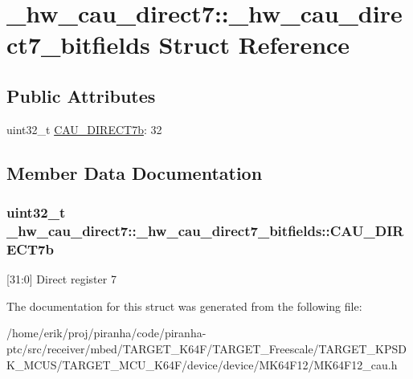 \hypertarget{struct__hw__cau__direct7_1_1__hw__cau__direct7__bitfields}{}\section{\+\_\+hw\+\_\+cau\+\_\+direct7\+:\+:\+\_\+hw\+\_\+cau\+\_\+direct7\+\_\+bitfields Struct Reference}
\label{struct__hw__cau__direct7_1_1__hw__cau__direct7__bitfields}
\subsection*{Public Attributes}
\begin{DoxyCompactItemize}
\item 
uint32\+\_\+t \hyperlink{struct__hw__cau__direct7_1_1__hw__cau__direct7__bitfields_ae5ff2f074fe2e7457a8491fe7e84d2f1}{C\+A\+U\+\_\+\+D\+I\+R\+E\+C\+T7b}\+: 32
\end{DoxyCompactItemize}


\subsection{Member Data Documentation}
\subsubsection[{\texorpdfstring{C\+A\+U\+\_\+\+D\+I\+R\+E\+C\+T7b}{CAU_DIRECT7b}}]{\setlength{\rightskip}{0pt plus 5cm}uint32\+\_\+t \+\_\+hw\+\_\+cau\+\_\+direct7\+::\+\_\+hw\+\_\+cau\+\_\+direct7\+\_\+bitfields\+::\+C\+A\+U\+\_\+\+D\+I\+R\+E\+C\+T7b}\hypertarget{struct__hw__cau__direct7_1_1__hw__cau__direct7__bitfields_ae5ff2f074fe2e7457a8491fe7e84d2f1}{}\label{struct__hw__cau__direct7_1_1__hw__cau__direct7__bitfields_ae5ff2f074fe2e7457a8491fe7e84d2f1}
\mbox{[}31\+:0\mbox{]} Direct register 7 

The documentation for this struct was generated from the following file\+:\begin{DoxyCompactItemize}
\item 
/home/erik/proj/piranha/code/piranha-\/ptc/src/receiver/mbed/\+T\+A\+R\+G\+E\+T\+\_\+\+K64\+F/\+T\+A\+R\+G\+E\+T\+\_\+\+Freescale/\+T\+A\+R\+G\+E\+T\+\_\+\+K\+P\+S\+D\+K\+\_\+\+M\+C\+U\+S/\+T\+A\+R\+G\+E\+T\+\_\+\+M\+C\+U\+\_\+\+K64\+F/device/device/\+M\+K64\+F12/M\+K64\+F12\+\_\+cau.\+h\end{DoxyCompactItemize}
